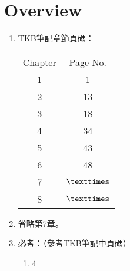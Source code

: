 \section{Overview}

\begin{enumerate}
    \item TKB筆記\cite{2}章節頁碼：
    \begin{table}[H]
        \centering
        \begin{tabular}{|c|c|}
            \hline
            Chapter & Page No. \\
            \Xhline{2\arrayrulewidth}
            1 & 1 \\
            \hline
            2 & 13 \\
            \hline
            3 & 18 \\
            \hline
            4 & 34 \\
            \hline
            5 & 43 \\
            \hline
            6 & 48 \\
            \hline
            7 & $\texttimes$ \\
            \hline
            8 & $\texttimes$ \\
            \hline
        \end{tabular}
    \end{table}
    \item 省略第7章。
    \item 必考：（參考TKB筆記\cite{2}中頁碼）
    \begin{enumerate}
        \item 4
    \end{enumerate}
\end{enumerate}

\pagebreak